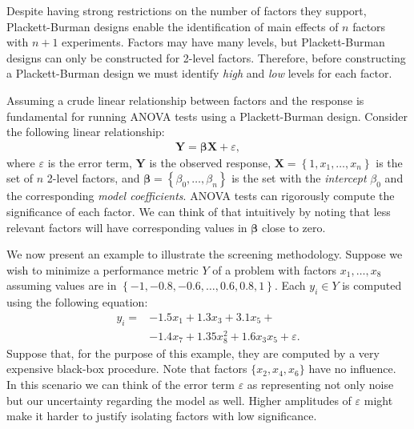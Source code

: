 \documentclass[conference]{IEEEtran}
\begin{document}
Despite having strong restrictions on the number of factors they support,
Plackett-Burman designs enable the identification of main effects of \(n\) factors
with \(n + 1\) experiments. Factors may have many levels, but Plackett-Burman
designs can only be constructed for 2-level factors. Therefore, before
constructing a Plackett-Burman design we must identify \emph{high} and \emph{low} levels
for each factor.

Assuming a crude linear relationship between factors and the response is
fundamental for running ANOVA tests using a Plackett-Burman design. Consider the
following linear relationship:
\vspace{-5pt}
{\normalsize
\begin{align}
\mathbf{Y} = \bm{\beta}\mathbf{X} + \varepsilon,
\label{eq:linear_assumption}
\end{align}
}
\vspace{-1pt}
where \(\varepsilon\) is the error term, \(\mathbf{Y}\) is the observed response,
\(\mathbf{X} = \left\{1, x_1,\dots,x_n\right\}\) is the set of \(n\) 2-level
factors, and \(\bm{\beta} = \left\{\beta_0,\dots,\beta_n\right\}\) is the set with
the \emph{intercept} \(\beta_0\) and the corresponding \emph{model coefficients}. ANOVA
tests can rigorously compute the significance of each factor. We can think of
that intuitively by noting that less relevant factors will have corresponding
values in \(\bm{\beta}\) close to zero.

We now present an example to illustrate the screening methodology. Suppose we
wish to minimize a performance metric \(Y\) of a problem with factors
\(x_1,\dots,x_8\) assuming values are in \(\left\{-1, -0.8, -0.6, \dots, 0.6, 0.8,
1\right\}\). Each \(y_i \in Y\) is computed using the following equation:
\vspace{-5pt}
{\normalsize
\begin{align}
\label{eq:real_model}
y_i = & -1.5x_1 + 1.3x_3 + 3.1x_5 + \\
& -1.4x_7 + 1.35x_8^2 + 1.6x_3x_5 + \varepsilon. \nonumber
\end{align}
}
\vspace{-1pt}
Suppose that, for the purpose of this example, they are computed by a very
expensive black-box procedure. Note that factors \(\{x_2,x_4,x_6\}\) have no
influence. In this scenario we can think of the error term \(\varepsilon\) as
representing not only noise but our uncertainty regarding the model as well.
Higher amplitudes of \(\varepsilon\) might make it harder to justify isolating
factors with low significance.
\end{document}
